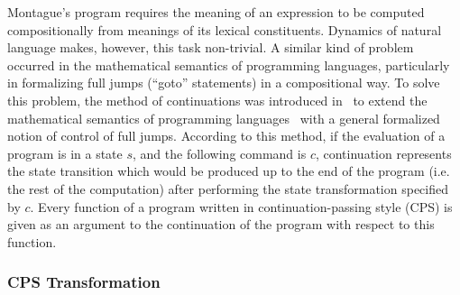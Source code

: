 Montague's program requires the meaning of an expression to be computed compositionally from meanings of its lexical constituents. Dynamics of natural language makes, however, this task non-trivial. A similar kind of problem occurred in the mathematical semantics of programming languages, particularly in formalizing full jumps (``goto'' statements) in a compositional way. To solve this problem, the method of continuations was introduced in~\cite{StracheyWadsworth:1974:Continuations:-A-Mathematical-Semantics-for-Handling-Full-Jumps} to extend the mathematical semantics of programming languages~\cite{ScottStrachey:1971:Toward-a-Mathematical-Semantics-for-Computer-Languages} with a general formalized notion of control of full jumps. According to this method, if the evaluation of a program is in a state $s$, and the following command is $c$, continuation represents the state transition which would be produced up to the end of the program (i.e. the rest of the computation) after performing the state transformation specified by $c$. Every function of a program written in continuation-passing style (CPS) is given as an argument to the continuation of the program with respect to this function. 

\subsubsection{CPS Transformation}

